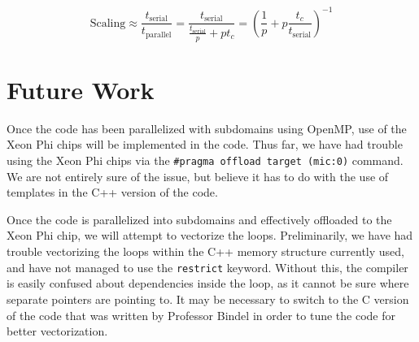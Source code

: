 \documentclass[12pt]{article}
\begin{document}
\begin{equation}
\mathrm{Scaling} \approx \frac{t_{\mathrm{serial}}}{t_{\mathrm{parallel}}} = \frac{t_{\mathrm{serial}}}{\frac{t_{\mathrm{serial}}}{p} + p t_c} = \left (\frac{1}{p}+p \frac{t_c}{t_{\mathrm{serial}}} \right)^{-1}
\label{exps}
\end{equation}

\section{Future Work}
Once the code has been parallelized with subdomains using OpenMP, use of the Xeon Phi chips will be implemented in the code. Thus far, we have had trouble using the Xeon Phi chips via the \texttt{\#pragma offload target (mic:0)} command. We are not entirely sure of the issue, but believe it has to do with the use of templates in the C++ version of the code.

Once the code is parallelized into subdomains and effectively offloaded to the Xeon Phi chip, we will attempt to vectorize the loops. Preliminarily, we have had trouble vectorizing the loops within the C++ memory structure currently used, and have not managed to use the \texttt{restrict} keyword. Without this, the compiler is easily confused about dependencies inside the loop, as it cannot be sure where separate pointers are pointing to. It may be necessary to switch to the C version of the code that was written by Professor Bindel in order to tune the code for better vectorization.


\FloatBarrier
	 
	
	
\end{document}
